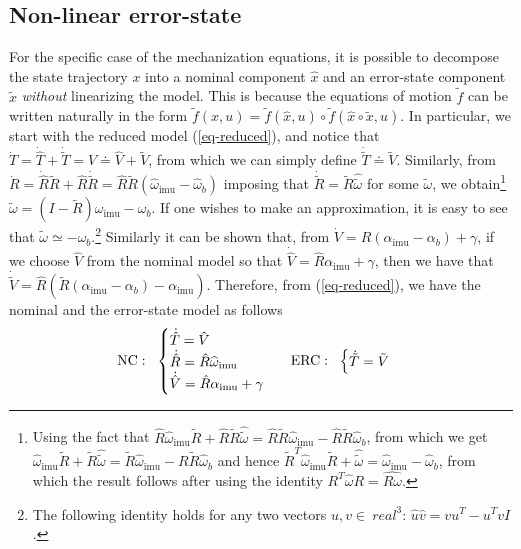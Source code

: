 \documentclass[]{article}
\def\w{\omega}
\def\hw{{\widehat\w}}
\def\ww{\tilde\w}
\def\imu{_\mathrm{imu}}
\begin{document}
{\subsection{Non-linear error-state}
%
For the specific case of the mechanization equations, it is possible to decompose the state trajectory $x$ into a nominal component $\hat x$ and an error-state component $\tilde x$ {\em without} linearizing the model. This is because the equations of motion $\tilde f$ can be written naturally in the form $\tilde f(x, u) = \tilde f(\hat x, u)\circ \tilde f(\hat x\circ \tilde x, u)$. In particular, we start with the reduced model (\ref{eq-reduced}), and notice that $\dot T = \dot {\hat T} + \dot {\tilde T} = V \doteq \hat V + \tilde V$, from which we can simply define $\dot {\tilde T} \doteq \tilde V$. 
%
Similarly, from $\dot R = \dot {\hat R} {\tilde R} + \hat R \dot{\tilde R} = \hat R \tilde R(\widehat \w\imu -\hw_b)$ imposing that $\dot{\tilde R} = \tilde R \widehat{\ww}$ for some $\ww$, we obtain\footnote{Using the fact that $\hat R \widehat \w\imu  \tilde R + \hat R \tilde R \widehat{\ww} = \hat R \tilde R \hw\imu  - \hat R \tilde R \widehat \w_b$, from which we get $\widehat \w\imu  \tilde R + \tilde R \widehat{\ww} = \tilde R \hw\imu  - R \tilde R \widehat \w_b$ and hence ${\tilde R}^T \widehat \w\imu  \tilde R + \widehat{\ww} =  \hw\imu  - \widehat \w_b$, from which the result follows after using the identity $R^T\widehat \w R = \widehat{R\w}$.} $\ww = (I- \tilde R) \w\imu  - \w_b$. If one wishes to make an approximation, it is easy to see that $\ww \simeq -\w_b$.\footnote{The following identity holds for any two vectors $u, v \in 
\
real^3$: $\widehat u \widehat v = v u^T - u^T v I$.} Similarly it can be shown that, from $\dot V = R(\alpha\imu  - \alpha_b) + \gamma$, if we choose $\hat V$ from the nominal model so that $\dot{\hat V} = \hat R\alpha\imu  + \gamma$, then we have that $\dot{\tilde V} = \hat R(\tilde R(\alpha\imu  - \alpha_b) - \alpha\imu )$. Therefore, from (\ref{eq-reduced}), we have the nominal and the error-state model as follows
\begin{equation}
{\rm NC:}~~
\begin{cases}
\dot{\hat T} = \hat V \\ 
\dot{\hat R} = \hat R \widehat \w\imu  \\
\dot{\hat V} = \hat R\alpha\imu  + \gamma
\end{cases}
~~ {\rm ERC:}~~
\begin{cases}
\dot{\tilde T} = \tilde V \\

\end{cases}
\end{equation}}
\end{document}
